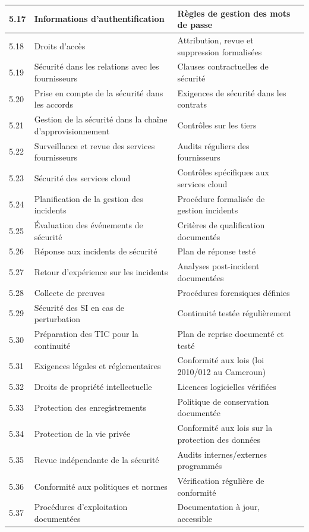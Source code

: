 \documentclass[12pt,a4paper,oneside]{report}
\begin{document}
\begin{longtable}{|p{1.5cm}|p{6.5cm}|p{4.5cm}|p{1cm}|}
\hline\rowcolor{trow1}
5.17 & Informations d'authentification &
  Règles de gestion des mots de passe & \\
\hline\rowcolor{trow2}
5.18 & Droits d'accès &
  Attribution, revue et suppression formalisées & \\
\hline\rowcolor{trow1}
5.19 & Sécurité dans les relations avec les fournisseurs &
  Clauses contractuelles de sécurité & \\
\hline\rowcolor{trow2}
5.20 & Prise en compte de la sécurité dans les accords &
  Exigences de sécurité dans les contrats & \\
\hline\rowcolor{trow1}
5.21 & Gestion de la sécurité dans la chaîne d'approvisionnement &
  Contrôles sur les tiers & \\
\hline\rowcolor{trow2}
5.22 & Surveillance et revue des services fournisseurs &
  Audits réguliers des fournisseurs & \\
\hline\rowcolor{trow1}
5.23 & Sécurité des services cloud &
  Contrôles spécifiques aux services cloud & \\
\hline\rowcolor{trow2}
5.24 & Planification de la gestion des incidents &
  Procédure formalisée de gestion incidents & \\
\hline\rowcolor{trow1}
5.25 & Évaluation des événements de sécurité &
  Critères de qualification documentés & \\
\hline\rowcolor{trow2}
5.26 & Réponse aux incidents de sécurité &
  Plan de réponse testé & \\
\hline\rowcolor{trow1}
5.27 & Retour d'expérience sur les incidents &
  Analyses post-incident documentées & \\
\hline\rowcolor{trow2}
5.28 & Collecte de preuves &
  Procédures forensiques définies & \\
\hline\rowcolor{trow1}
5.29 & Sécurité des SI en cas de perturbation &
  Continuité testée régulièrement & \\
\hline\rowcolor{trow2}
5.30 & Préparation des TIC pour la continuité &
  Plan de reprise documenté et testé & \\
\hline\rowcolor{trow1}
5.31 & Exigences légales et réglementaires &
  Conformité aux lois (loi 2010/012 au Cameroun) & \\
\hline\rowcolor{trow2}
5.32 & Droits de propriété intellectuelle &
  Licences logicielles vérifiées & \\
\hline\rowcolor{trow1}
5.33 & Protection des enregistrements &
  Politique de conservation documentée & \\
\hline\rowcolor{trow2}
5.34 & Protection de la vie privée &
  Conformité aux lois sur la protection des données & \\
\hline\rowcolor{trow1}
5.35 & Revue indépendante de la sécurité &
  Audits internes/externes programmés & \\
\hline\rowcolor{trow2}
5.36 & Conformité aux politiques et normes &
  Vérification régulière de conformité & \\
\hline\rowcolor{trow1}
5.37 & Procédures d'exploitation documentées &
  Documentation à jour, accessible & \\
\hline
\end{longtable}
\end{document}
